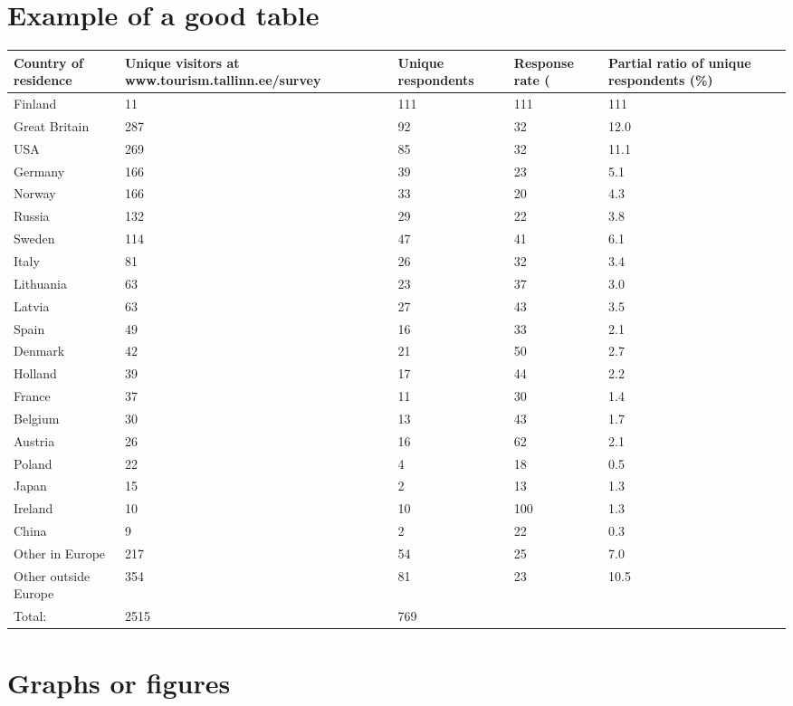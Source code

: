 \section{Example of a good table}
\label{sec:tableexample}


\begin{tabular}{|p{3cm}|p{3cm}|p{3cm}|p{3cm}|p{3cm}|}
	\hline 
	Country of residence & Unique visitors at www.tourism.tallinn.ee/survey & Unique respondents
	& Response rate (%
	& Partial ratio of unique respondents (\%) \\
    \hline	 
	Finland & 11 & 111 & 111 & 111 \\
	\hline
	Great Britain & 287 & 92 & 32 & 12.0\\
	\hline
	USA & 269 & 85 & 32 & 11.1\\
	\hline
	Germany & 166 &	39 & 23 & 5.1\\
	\hline
	Norway & 166 & 33 & 20 & 4.3\\
	\hline
	Russia & 132 & 29 & 22 & 3.8\\
	\hline
	Sweden & 114 & 47 & 41 & 6.1\\
	\hline
	Italy & 81 & 26 & 32 & 3.4\\
	\hline
	Lithuania & 63 & 23 & 37 & 3.0\\
	\hline
	Latvia & 63 & 27 & 43 & 3.5\\
	\hline
	Spain & 49 & 16 & 33 & 2.1\\
	\hline
	Denmark & 42 & 21 & 50 & 2.7\\
	\hline
	Holland & 39 & 17 & 44 & 2.2\\
	\hline
	France & 37 & 11 & 30 & 1.4\\
	\hline
	Belgium & 30 & 13 & 43 & 1.7\\
	\hline
	Austria & 26 & 16 & 62 & 2.1\\
	\hline
	Poland  & 22 & 4 & 18 & 0.5\\
	\hline
	Japan & 15 & 2 &	13 & 1.3\\
	\hline
	Ireland & 10 & 10 & 100 & 1.3\\
	\hline
	China  & 9 & 2 & 22 & 0.3\\
	\hline
	Other in Europe & 217 & 54 & 25 & 7.0\\
	\hline
	Other outside Europe & 354 & 81 & 23 & 10.5\\
	\hline\hline
	Total: & 2515 & 769  &   &  \\
	\hline 
\end{tabular} 
	
\section{Graphs or figures}
\label{sec:tableexample}

